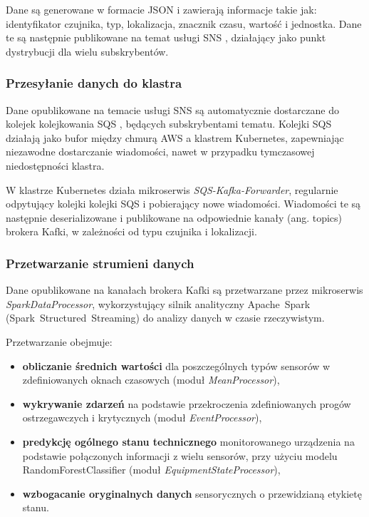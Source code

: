 Dane są generowane w formacie JSON i zawierają informacje takie jak: identyfikator czujnika, typ, lokalizacja, znacznik czasu, wartość i
jednostka. Dane te są następnie publikowane na temat usługi SNS \cite{sns_docs}, działający jako punkt dystrybucji dla wielu subskrybentów.

\subsubsection{Przesyłanie danych do klastra}
\label{subsubsec:przesylanie_danych}

Dane opublikowane na temacie usługi SNS są automatycznie dostarczane do kolejek kolejkowania SQS \cite{sqs_docs}, będących subskrybentami tematu. Kolejki SQS działają jako bufor między chmurą AWS a klastrem Kubernetes, zapewniając niezawodne dostarczanie wiadomości, nawet w przypadku tymczasowej niedostępności klastra.

W klastrze Kubernetes działa mikroserwis \textit{\mbox{SQS-Kafka-Forwarder}}, regularnie odpytujący kolejki kolejki SQS i pobierający nowe wiadomości. Wiadomości te są następnie deserializowane i publikowane na odpowiednie kanały (ang. \mbox{topics}) brokera Kafki, w zależności od typu czujnika i lokalizacji.

\subsubsection{Przetwarzanie strumieni danych}
\label{subsubsec:przetwarzanie_strumieni}

Dane opublikowane na kanałach brokera Kafki są przetwarzane przez mikroserwis \\ \textit{\mbox{SparkDataProcessor}}, wykorzystujący silnik analityczny \mbox{Apache Spark} \mbox{(Spark Structured Streaming)} \cite{spark_streaming} do analizy danych w czasie rzeczywistym. 

\vspace{0.3em}

Przetwarzanie obejmuje:

\begin{itemize}
    \item \textbf{obliczanie średnich wartości} dla poszczególnych typów sensorów w zdefiniowanych oknach czasowych (moduł \textit{\mbox{MeanProcessor}}),
    \item \textbf{wykrywanie zdarzeń} na podstawie przekroczenia zdefiniowanych progów ostrzegawczych i krytycznych (moduł \textit{\mbox{EventProcessor}}),
    \item \textbf{predykcję ogólnego stanu technicznego} monitorowanego urządzenia na podstawie połączonych informacji z wielu sensorów, przy użyciu modelu \mbox{RandomForestClassifier} (moduł \textit{\mbox{EquipmentStateProcessor}}),
    \item \textbf{wzbogacanie oryginalnych danych} sensorycznych o przewidzianą etykietę stanu.
\end{itemize}

